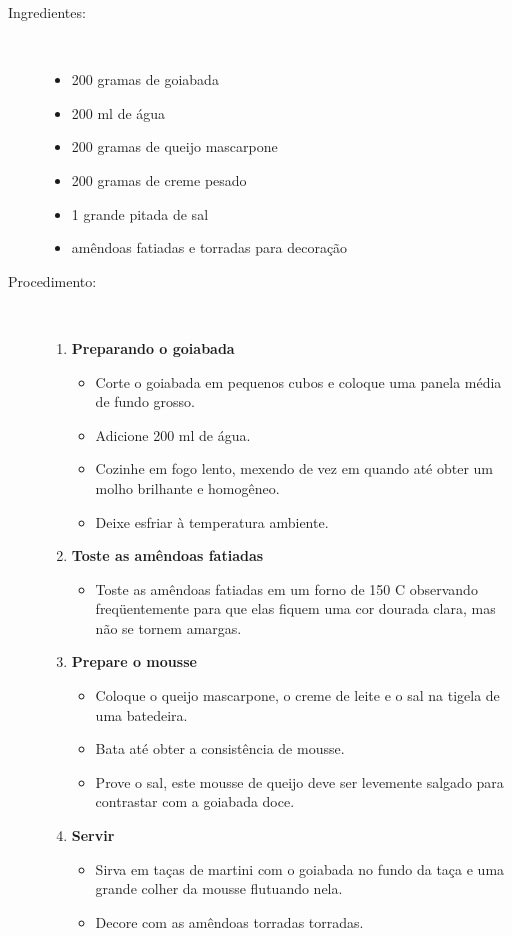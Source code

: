 \documentclass [11pt, letterpaper] {article}
\begin{document}
\begin {description}

\item [Ingredientes:] \ \\
\begin {itemize}
\item 200 gramas de goiabada
\item 200 ml de água
\item 200 gramas de queijo mascarpone
\item 200 gramas de creme pesado
\item 1 grande pitada de sal
\item amêndoas fatiadas e torradas para decoração
\end {itemize}

\item [Procedimento:] \ \\

\begin {enumerate}
\item {\bf Preparando o goiabada}
\begin {itemize}
\item Corte o goiabada em pequenos cubos e coloque uma panela m\'edia de fundo grosso.
\item Adicione 200 ml de água.
\item Cozinhe em fogo lento, mexendo de vez em quando até obter um molho brilhante e homogêneo.
\item Deixe esfriar à temperatura ambiente.
\end {itemize}

\item {\bf Toste as amêndoas fatiadas}
\begin {itemize}
\item Toste as amêndoas fatiadas em um forno de 150 C observando freqüentemente para que elas fiquem uma cor dourada clara, mas não se tornem amargas.
\end {itemize}

\item {\bf Prepare o mousse}
\begin {itemize}
\item Coloque o queijo mascarpone, o creme de leite e o sal na tigela de uma batedeira.
\item Bata at\'e obter a consistência de mousse.
\item Prove o sal, este mousse de queijo deve ser levemente salgado para contrastar com a goiabada doce.
\end {itemize}

\item {\bf Servir}
\begin {itemize}
\item Sirva em ta\c{c}as de martini com o goiabada no fundo da ta\c{c}a e uma grande colher da mousse flutuando nela.
\item Decore com as amêndoas torradas torradas.
\end {itemize}

\end {enumerate}
\end {description}
\end{document}
